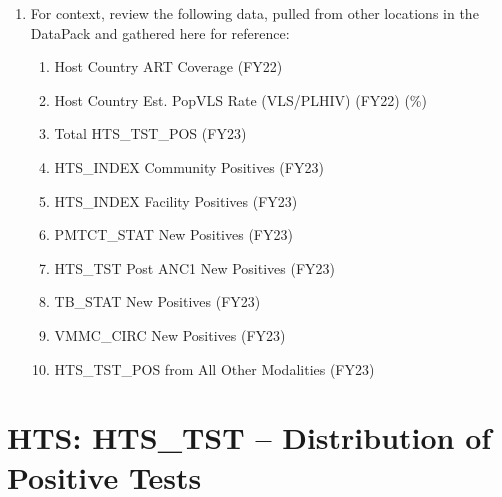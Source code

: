 \documentclass[
  openany]{book}
\begin{document}
\begin{enumerate}
\def\labelenumi{\arabic{enumi}.}
\item
  For context, review the following data, pulled from other locations in the DataPack and gathered here for reference:

  \begin{enumerate}
  \def\labelenumii{\alph{enumii}.}
  \item
    Host Country ART Coverage (FY22)
  \item
    Host Country Est. PopVLS Rate (VLS/PLHIV) (FY22) (\%)
  \item
    Total HTS\_TST\_POS (FY23)
  \item
    HTS\_INDEX Community Positives (FY23)
  \item
    HTS\_INDEX Facility Positives (FY23)
  \item
    PMTCT\_STAT New Positives (FY23)
  \item
    HTS\_TST Post ANC1 New Positives (FY23)
  \item
    TB\_STAT New Positives (FY23)
  \item
    VMMC\_CIRC New Positives (FY23)
  \item
    HTS\_TST\_POS from All Other Modalities (FY23)
  \end{enumerate}
\end{enumerate}

\hypertarget{hts-hts_tst-distribution-of-positive-tests}{%
\section{HTS: HTS\_TST -- Distribution of Positive Tests}\label{hts-hts_tst-distribution-of-positive-tests}}
\end{document}
